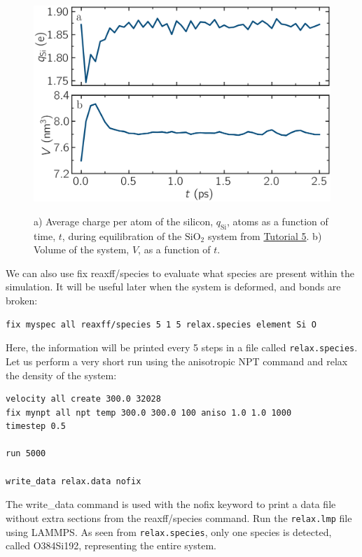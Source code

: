 \documentclass[9pt,tutorial]{livecoms}
\newcommand{\lmpcmd}[1]{\colorbox{listing}{\textcolor{command}{\small{#1}}}} %
\newcommand{\flecmd}[1]{\textcolor{command}{\texttt{#1}}} %
\begin{document}
\begin{figure}
\centering
\includegraphics[width=\linewidth]{SIO-charge}\\[-2ex]
\caption{a) Average charge per atom of the silicon, $q_\text{Si}$, atoms as
a function of time, $t$, during equilibration of the $\text{SiO}_2$ system
from \hyperref[reactive-silicon-dioxide-label]{Tutorial 5}.  b) Volume of the
system, $V$, as a function of $t$.}
\label{fig:SIO-charge}
\end{figure}

We can also use \lmpcmd{fix reaxff/species} to evaluate what species are
present within the simulation.  It will be useful later when the system is deformed,
and bonds are broken:
\begin{lstlisting}
fix myspec all reaxff/species 5 1 5 relax.species element Si O
\end{lstlisting}
Here, the information will be printed every 5 steps in a file called \flecmd{relax.species}.
Let us perform a very short run using the anisotropic NPT command and relax the
density of the system:
\begin{lstlisting}
velocity all create 300.0 32028
fix mynpt all npt temp 300.0 300.0 100 aniso 1.0 1.0 1000
timestep 0.5

run 5000

write_data relax.data nofix
\end{lstlisting}
The \lmpcmd{write\_data} command is used with the \lmpcmd{nofix} keyword to
print a data file without extra sections from the \lmpcmd{reaxff/species} command.
Run the \flecmd{relax.lmp} file using LAMMPS.  As seen from \flecmd{relax.species},
only one species is detected, called \lmpcmd{O384Si192}, representing the entire system.
\end{document}
